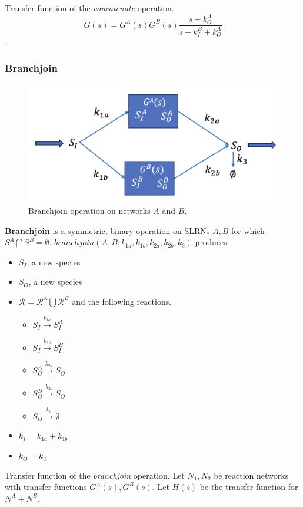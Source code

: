 \documentclass[unnumsec,webpdf,contemporary,large]{oup-authoring-template}%
\theoremstyle{thmstyleone}%
\theoremstyle{thmstyletwo}%
\theoremstyle{thmstylethree}%
\begin{document}
Transfer function of the {\em concatenate} operation.
$$G(s) = G^A(s) G^B(s)\frac{s + k^A_O}{s+ k^B_I + k^A_O}$$.

\subsubsection{Branchjoin}
\begin{figure}
         \centering
         \includegraphics[scale=0.3]{figures/branchjoin.png}
          \caption[]{Branchjoin operation on networks $A$ and $B$.}
         \label{fig:branchjoin}
\end{figure}

{\bf Branchjoin} is a symmetric, binary operation on SLRNs $A, B$ for which
$S^A \bigcap S^B = \emptyset$.
$branchjoin(A, B; k_{1a}, k_{1b}, k_{2a}, k_{2b}, k_3)$
produces:
\begin{itemize}
\item $S_I$, a new species
\item $S_O$, a new species
\item $\mathcal{R} = \mathcal{R}^A \bigcup \mathcal{R}^B$ and the following reactions.
\begin{itemize}
\item
$S_I \xrightarrow{k_{1a}} S^A_I$
\item $S_I \xrightarrow{k_{1b}} S^B_I$
\item
$S^A_O \xrightarrow{k_{2a}} S_O$
\item
$S^B_O \xrightarrow{k_{2b}} S_O$
\item
$S_O \xrightarrow{k_3} \emptyset$
\end{itemize}
\item $k_I = k_{1a} + k_{1b}$
\item $k_O = k_3$
\end{itemize}

Transfer function of the {\em branchjoin} operation.
Let $N_1, N_2$ be reaction networks with transfer functions $G^A(s), G^B(s)$. Let $H(s)$ be the transfer function for $N^A + N^B$.
\end{document}
